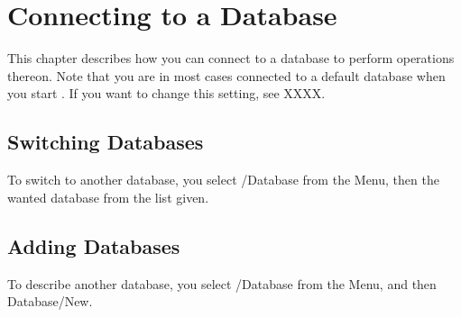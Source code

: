
\chapter{Connecting to a Database}
\label{cha:uconn}

This chapter describes how you can connect to a database to perform
operations thereon. Note that you are in most cases connected to a
default database when you start \Pyb. If you want to change this
setting, see XXXX.


\section{Switching Databases}
\label{sec:uconnsw}

To switch to another database, you select \textsf{\Pyb/Database} from
the Menu, then the wanted database from the list given.


\section{Adding Databases}
\label{sec:uconndd}

To describe another database, you select \textsf{\Pyb/Database} from
the Menu, and then \textsf{Database/New}. 



 

